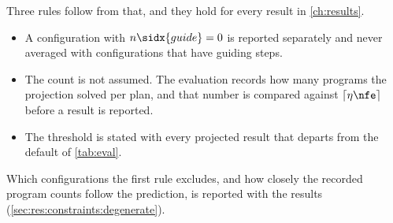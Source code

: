 Three rules follow from that, and they hold for every result in \autoref{ch:results}.

\begin{itemize}
  \item A configuration with $n\sidx{guide}=0$ is reported separately and never averaged with
    configurations that have guiding steps.
  \item The count is not assumed. The evaluation records how many programs the projection solved per
    plan, and that number is compared against $\lceil \eta\nfe \rceil$ before a result is reported.
  \item The threshold is stated with every projected result that departs from the default of
    \autoref{tab:eval}.
\end{itemize}

Which configurations the first rule excludes, and how closely the recorded program counts follow the
prediction, is reported with the results (\autoref{sec:res:constraints:degenerate}).
